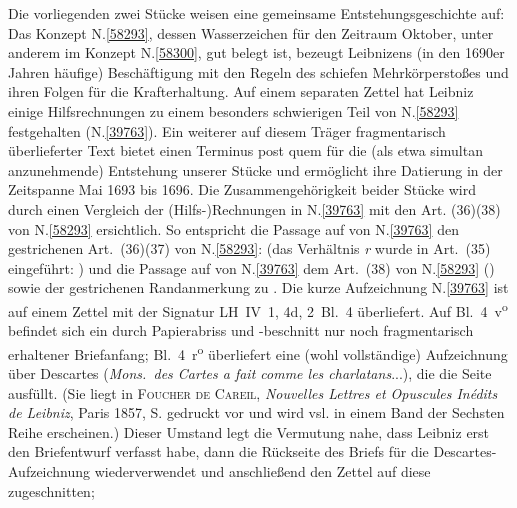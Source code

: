
\vspace{5mm}
\begin{ledgroup}
\footnotesize
\pstart
\noindent
Die vorliegenden zwei Stücke weisen eine gemeinsame Entstehungsgeschichte auf:
Das Konzept N.\;\ref{58293}, 
dessen Wasserzeichen für den Zeitraum Oktober, unter anderem im Konzept N.\;\ref{58300}, gut belegt ist,
bezeugt Leibnizens (in den 1690er Jahren häufige) Beschäftigung mit den Regeln des schiefen Mehrkörperstoßes und ihren Folgen für die Krafterhaltung.
Auf einem separaten Zettel hat Leibniz einige Hilfsrechnungen zu einem besonders schwierigen Teil von N.\;\ref{58293} festgehalten (N.\;\ref{39763}).
Ein weiterer auf diesem Träger fragmentarisch überlieferter Text bietet einen Terminus post quem 
für die (als etwa simultan anzunehmende) Entstehung unserer Stücke 
und ermöglicht ihre Datierung in der Zeitspanne Mai 1693 bis 1696.
\pend
\pstart
Die Zusammengehörigkeit beider Stücke wird durch einen Vergleich der (Hilfs-)Rechnungen in N.\;\ref{39763}  mit den Art. (36)\textendash(38) von N.\;\ref{58293} ersichtlich.
So entspricht die Passage auf  von N.\;\ref{39763} 
den gestrichenen Art.~(36)\textendash(37) von N.\;\ref{58293}:
(das Verhältnis \textit{r} wurde in Art.~(35) eingeführt:
)
und die Passage auf  von N.\;\ref{39763}
dem Art.~(38) von N.\;\ref{58293} ()
sowie der gestrichenen Randanmerkung zu
.
\pend
\pstart
Die kurze Aufzeichnung N.\;\ref{39763} ist auf einem Zettel mit der Signatur LH~IV~1, 4d, 2~Bl.~4 überliefert.
Auf Bl.~4~v\textsuperscript{o} befindet sich ein durch Papierabriss und -beschnitt nur noch fragmentarisch erhaltener Briefanfang; 
Bl.~4~r\textsuperscript{o} überliefert eine (wohl vollständige) Aufzeichnung über Descartes (\textit{Mons.~des Cartes a fait comme les charlatans}...), die die Seite ausfüllt. 
(Sie liegt in \cite{02150}\textsc{Foucher de Careil}, \textit{Nouvelles Lettres et Opuscules Inédits de Leibniz}, Paris 1857, S. gedruckt vor und wird vsl. in einem Band der Sechsten Reihe erscheinen.)
Dieser Umstand legt die Vermutung nahe, dass Leibniz erst den Briefentwurf verfasst habe, dann die Rückseite des Briefs für die Descartes-Aufzeichnung wiederverwendet und anschließend den Zettel auf diese zugeschnitten;

\end{ledgroup}

